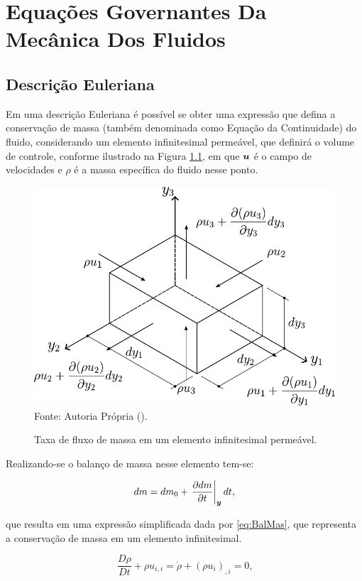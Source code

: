 \chapter[APÊNDICE \ref{Ap:CFD}]{Equações Governantes Da Mecânica Dos Fluidos}
\label{Ap:CFD}

\section{Descrição Euleriana} \label{CFD-E}

Em uma descrição Euleriana é possível se obter uma expressão que defina a conservação de massa (também denominada como Equação da Continuidade) do fluido, considerando um elemento infinitesimal permeável, que definirá o volume de controle, conforme ilustrado na Figura \ref{fig:BalMas}, em que $\boldsymbol{u}$ é o campo de velocidades e $\rho$ é a massa específica do fluido nesse ponto.

\begin{figure}[h!]
    \centering
    \caption{Taxa de fluxo de massa em um elemento infinitesimal permeável.}
    \includegraphics[width=.5\linewidth]{Figuras/BalMas.pdf}
    \\Fonte: Autoria Própria (\the\year).
    \label{fig:BalMas}
\end{figure}

Realizando-se o balanço de massa nesse elemento tem-se:

\begin{equation}
    dm=dm_0+\left.\frac{\partial{dm}}{\partial{t}}\right|_{\boldsymbol{y}}dt\text{,}
\end{equation}

\noindent que resulta em uma expressão simplificada dada por \ref{eq:BalMas}, que representa a conservação de massa em um elemento infinitesimal.

\begin{equation}
    \frac{D\rho}{Dt}+\rho u_{i,i}=\dot{\rho}+(\rho u_i)_{,i}=0\text{,}
    \label{eq:BalMas}
\end{equation}

